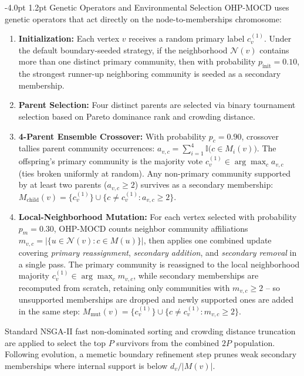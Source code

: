 \documentclass{svproc}
\makeatletter
\renewcommand\subsection{\@startsection{subsection}{2}{\z@}%
  {-4.0pt \@plus -0.5pt \@minus -0.5pt}%
  {1.2pt \@plus 0.5pt}%
  {\normalfont\normalsize\bfseries\boldmath}}
\makeatother
\begin{document}
\subsection{Genetic Operators and Environmental Selection}\label{subsec:operators}
OHP-MOCD uses genetic operators that act directly on the node-to-memberships chromosome:
\begin{enumerate}
    \item \textbf{Initialization:} Each vertex $v$ receives a random primary label $c_v^{(1)}$. Under the default boundary-seeded strategy, if the neighborhood $\mathcal{N}(v)$ contains more than one distinct primary community, then with probability $p_{\mathrm{init}} = 0.10$, the strongest runner-up neighboring community is seeded as a secondary membership.
    \item \textbf{Parent Selection:} Four distinct parents are selected via binary tournament selection based on Pareto dominance rank and crowding distance.
    \item \textbf{4-Parent Ensemble Crossover:} With probability $p_c = 0.90$, crossover tallies parent community occurrences: $a_{v,c} = \sum_{i=1}^{4} \mathbb{I}\big(c \in M_i(v)\big)$. The offspring's primary community is the majority vote $c_v^{(1)} \in \arg\max_c a_{v,c}$ (ties broken uniformly at random). Any non-primary community supported by at least two parents ($a_{v,c} \ge 2$) survives as a secondary membership: $M_{\mathrm{child}}(v) = \{c_v^{(1)}\} \cup \{c \neq c_v^{(1)} : a_{v,c} \ge 2\}$.
    \item \textbf{Local-Neighborhood Mutation:} For each vertex selected with probability $p_m = 0.30$, OHP-MOCD counts neighbor community affiliations $m_{v,c} = |\{u \in \mathcal{N}(v) : c \in M(u)\}|$, then applies one combined update covering \emph{primary reassignment}, \emph{secondary addition}, and \emph{secondary removal} in a single pass. The primary community is reassigned to the local neighborhood majority $c_v^{(1)} \in \arg\max_c m_{v,c}$, while secondary memberships are recomputed from scratch, retaining only communities with $m_{v,c} \ge 2$ -- so unsupported memberships are dropped and newly supported ones are added in the same step: $M_{\mathrm{mut}}(v) = \{c_v^{(1)}\} \cup \{c \neq c_v^{(1)} : m_{v,c} \ge 2\}$.
\end{enumerate}
Standard NSGA-II fast non-dominated sorting and crowding distance truncation are applied to select the top $P$ survivors from the combined $2P$ population. Following evolution, a memetic boundary refinement step prunes weak secondary memberships where internal support is below $d_v / |M(v)|$.
\end{document}
